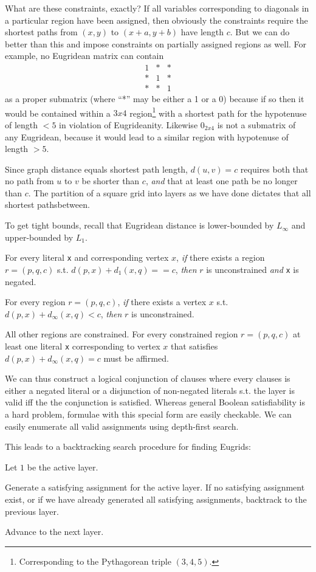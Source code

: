 \documentclass[letterpaper]{article}
\begin{document}
What are these constraints, exactly? If all variables corresponding to diagonals in a
particular region have been assigned, then obviously the constraints require the shortest
paths from $(x, y)$ to $(x+a, y+b)$ have length $c$. But we can do better than this and
impose constraints on partially assigned regions as well. For example, no Eugridean matrix
can contain
\begin{equation*}
\begin{matrix}
  1 & * & * \\
  * & 1 & * \\
  * & * & 1
\end{matrix}
\end{equation*}
as a proper submatrix (where ``*'' may be either a 1 or a 0) because if so then it would be
contained within a $3x4$ region\footnote{Corresponding to the Pythagorean triple $(3, 4,
5)$.} with a shortest path for the hypotenuse of length $< 5$ in violation of Eugrideanity.
Likewise $0_{2 x 4}$ is not a submatrix of any Eugridean, because it would lead to a similar
region with hypotenuse of length $> 5$.

Since graph distance equals shortest path length, $d(u, v) = c$ requires both that no path
from $u$ to $v$ be shorter than $c$, \emph{and} that at least one path be no longer than $c$.
The partition of a square grid into layers as we have done dictates that all shortest pathsbetween.

To get tight bounds, recall that Eugridean distance is lower-bounded by $L_\infty$ and
upper-bounded by $L_1$.

For every literal \verb|x| and corresponding vertex $x$, \emph{if} there exists a region
$r = (p, q, c)$ s.t. $d(p, x) + d_1(x, q) == c$, \emph{then} $r$ is unconstrained \emph{and}
\verb|x| is negated.

For every region $r = (p, q, c)$, \emph{if} there exists a vertex $x$ s.t.
$d(p, x) + d_{\infty}(x, q) < c$, \emph{then} $r$ is unconstrained.

All other regions are constrained. For every constrained region $r = (p, q, c)$ at least one
literal \verb|x| corresponding to vertex $x$ that satisfies $d(p, x) + d_{\infty}(x, q) = c$
must be affirmed.

We can thus construct a logical conjunction of clauses where every clauses is either a
negated literal or a disjunction of non-negated literals s.t. the layer is valid iff the the
conjunction is satisfied. Whereas general Boolean satisfiability is a hard problem, formulae
with this special form are easily checkable. We can easily enumerate all valid assignments
using depth-first search.

This leads to a backtracking search procedure for finding Eugrids:

Let $1$ be the active layer.

Generate a satisfying assignment for the active layer. If no satisfying assignment exist, or
if we have already generated all satisfying assignments, backtrack to the previous layer.

Advance to the next layer.
\end{document}
